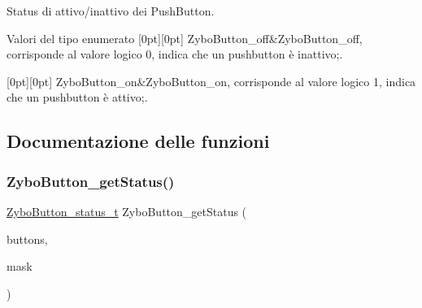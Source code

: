 Status di attivo/inattivo dei Push\+Button. 

\begin{DoxyEnumFields}{Valori del tipo enumerato}
[0pt][0pt]{}\mbox{\label{group___button_gga85c290bfa232cab213e69200bf78e06aacd110f28912806bcec929721e8737399}} 
Zybo\+Button\+\_\+off&Zybo\+Button\+\_\+off, corrisponde al valore logico \textquotesingle{}0\textquotesingle{}, indica che un pushbutton è inattivo;. \\
\hline

[0pt][0pt]{}\mbox{\label{group___button_gga85c290bfa232cab213e69200bf78e06aa49bf4a6902270f28bc6a1146fbd1b1fe}} 
Zybo\+Button\+\_\+on&Zybo\+Button\+\_\+on, corrisponde al valore logico \textquotesingle{}1\textquotesingle{}, indica che un pushbutton è attivo;. \\
\hline

\end{DoxyEnumFields}


\subsection{Documentazione delle funzioni}
\mbox{\label{group___button_ga75407539e8ba0ad3ea142496219cd083}} 
\subsubsection{\texorpdfstring{Zybo\+Button\+\_\+get\+Status()}{ZyboButton\_getStatus()}}
{\footnotesize\ttfamily \hyperlink{group___button_ga85c290bfa232cab213e69200bf78e06a}{Zybo\+Button\+\_\+status\+\_\+t} Zybo\+Button\+\_\+get\+Status (\begin{DoxyParamCaption}\item[{\hyperlink{struct_zybo_button__t}{Zybo\+Button\+\_\+t} $\ast$}]{buttons,  }\item[{\hyperlink{group___button_ga4d26a5f6cad606de534ba034e0ba42dd}{Zybo\+Button\+\_\+mask\+\_\+t}}]{mask }\end{DoxyParamCaption})}



